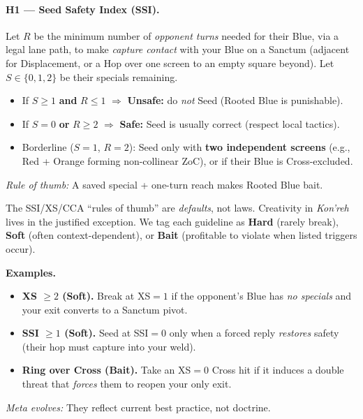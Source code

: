 \documentclass[11pt]{article}
\begin{document}
\paragraph{H1 — Seed Safety Index (SSI).}
Let $R$ be the minimum number of \emph{opponent turns} needed for their Blue, via a legal lane path, to make \emph{capture contact} with your Blue on a Sanctum (adjacent for Displacement, or a Hop over one screen to an empty square beyond). Let $S\in\{0,1,2\}$ be their specials remaining.
\begin{itemize}
  \item If $S\ge 1$ \textbf{and} $R\le 1$ $\Rightarrow$ \textbf{Unsafe:} do \emph{not} Seed (Rooted Blue is punishable).
  \item If $S=0$ \textbf{or} $R\ge 2$ $\Rightarrow$ \textbf{Safe:} Seed is usually correct (respect local tactics).
  \item Borderline ($S=1$, $R=2$): Seed only with \textbf{two independent screens} (e.g., Red + Orange forming non-collinear ZoC), or if their Blue is Cross-excluded.
\end{itemize}
\emph{Rule of thumb:} A saved special + one-turn reach makes Rooted Blue bait.

\begin{tcolorbox}[enhanced,breakable,title={Designer Note — Heuristics Are Handles, Not Handcuffs},
  colback=white,colframe=royal,boxrule=0.8pt]
\small
The SSI/XS/CCA “rules of thumb” are \emph{defaults}, not laws. Creativity in \textit{Kon'reh} lives in the justified exception.
We tag each guideline as \textbf{Hard} (rarely break), \textbf{Soft} (often context-dependent), or \textbf{Bait} (profitable to violate when listed triggers occur).

\textbf{Examples.}
\begin{itemize}[leftmargin=1.2em,itemsep=0.2em]
  \item \textbf{XS $\ge 2$ (Soft).} Break at XS$=1$ if the opponent’s Blue has \emph{no specials} and your exit converts to a Sanctum pivot.
  \item \textbf{SSI $\ge 1$ (Soft).} Seed at SSI$=0$ only when a forced reply \emph{restores} safety (their hop must capture into your weld).
  \item \textbf{Ring over Cross (Bait).} Take an XS$=0$ Cross hit if it induces a double threat that \emph{forces} them to reopen your only exit.
\end{itemize}
\emph{Meta evolves:} They reflect current best practice, not doctrine.
\end{tcolorbox}
\end{document}
